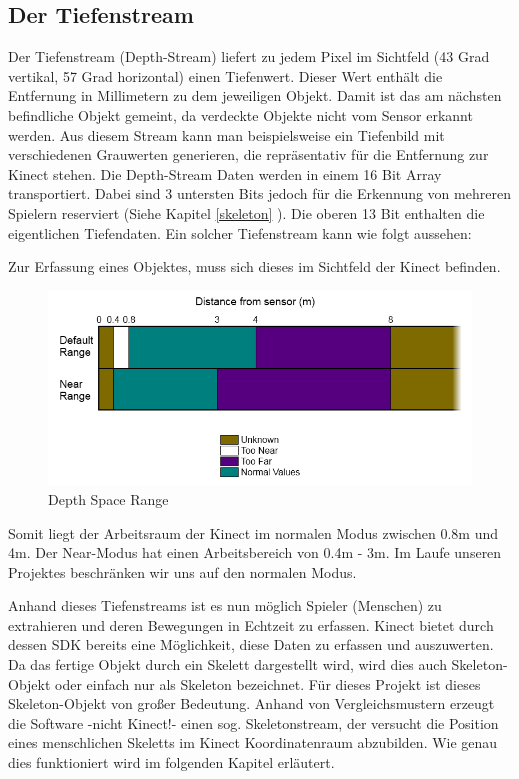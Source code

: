 \subsection{Der Tiefenstream}
Der Tiefenstream (Depth-Stream) liefert zu jedem Pixel im Sichtfeld (43 Grad vertikal, 57 Grad horizontal) einen Tiefenwert. Dieser Wert enthält die Entfernung in Millimetern zu dem jeweiligen Objekt.
Damit ist das am nächsten befindliche Objekt gemeint, da verdeckte Objekte nicht vom Sensor erkannt werden.
Aus diesem Stream kann man beispielsweise ein Tiefenbild mit verschiedenen Grauwerten generieren, die repräsentativ für die Entfernung zur Kinect stehen. Die Depth-Stream Daten werden in einem 16 Bit Array transportiert. Dabei sind 3 untersten Bits jedoch für die Erkennung von mehreren Spielern reserviert
(Siehe Kapitel \ref{skeleton} ). Die oberen 13 Bit enthalten die eigentlichen Tiefendaten. Ein solcher Tiefenstream kann wie folgt aussehen:



Zur Erfassung eines Objektes, muss sich dieses im Sichtfeld der Kinect befinden. 
\begin{figure}[H]						
	\centering							
	\includegraphics[scale=0.7]{Bilder/kinect_range.png}			
	\caption{Depth Space Range \cite{ws:microsoft_coordinateSpaces}}						
	\label{f:kinect_range}						
\end{figure}

Somit liegt der Arbeitsraum der Kinect im normalen Modus zwischen 0.8m und 4m. Der Near-Modus hat einen Arbeitsbereich von 0.4m - 3m. Im Laufe unseren Projektes beschränken wir uns auf den normalen Modus.

Anhand dieses Tiefenstreams ist es nun möglich Spieler (Menschen) zu extrahieren und deren Bewegungen
in Echtzeit zu erfassen. Kinect bietet durch dessen SDK bereits eine Möglichkeit, diese Daten zu
erfassen und auszuwerten. Da das fertige Objekt durch ein Skelett dargestellt wird, wird dies auch Skeleton-Objekt oder einfach nur als Skeleton bezeichnet. Für dieses Projekt ist dieses Skeleton-Objekt von großer Bedeutung. Anhand von Vergleichsmustern erzeugt die Software -nicht Kinect!- einen sog. Skeletonstream, der versucht die Position eines menschlichen Skeletts im Kinect Koordinatenraum abzubilden.\cite{SWB-376536934}
Wie genau dies funktioniert wird im folgenden Kapitel erläutert.



